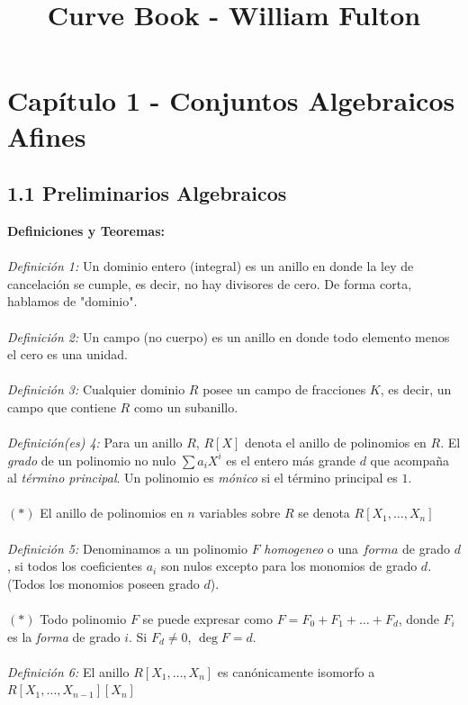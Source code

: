 \documentclass{article}
\begin{document}
\title{\textbf{Curve Book - William Fulton}}
\date{}
\maketitle
\section*{Capítulo 1 - Conjuntos Algebraicos Afines}
\subsection*{1.1 Preliminarios Algebraicos}
\textbf{Definiciones y Teoremas:}
\\
\\
\textit{Definición 1:} Un dominio entero (integral) es un anillo en donde la ley de cancelación se cumple, es decir, no hay divisores de cero. De forma corta, hablamos de "dominio".
\\
\\
\textit{Definición 2:} Un campo (no cuerpo) es un anillo en donde todo elemento menos el cero es una unidad.
\\
\\
\textit{Definición 3:} Cualquier dominio $R$ posee un campo de fracciones $K$, es decir, un campo que contiene $R$ como un subanillo.
\\
\\
\textit{Definición(es) 4:} Para un anillo $R$, $R[X]$ denota el anillo de polinomios en $R$. El \textit{grado} de un polinomio no nulo $\sum a_i X^{i}$ es el entero más grande $d$ que acompaña al \textit{término principal}. Un polinomio es \textit{mónico} si el término principal es $1$.
\\
\\
$(*)$ El anillo de polinomios en $n$ variables sobre $R$ se denota $R[X_1, \dots , X_n]$
\\
\\
\textit{Definición 5:} Denominamos a un polinomio $F$ \textit{homogeneo} o una $\textit{forma}$ de grado $d$, si todos los coeficientes $a_i$ son nulos excepto para los monomios de grado $d$. (Todos los monomios poseen grado $d$).
\\
\\
$(*)$ Todo polinomio $F$ se puede expresar como $F=F_{0}+F_1 + \dots +F_d$, donde $F_i$ es la \textit{forma} de grado $i$. Si $F_d \neq 0$, $\deg{F}=d$.
\\
\\
\textit{Definición 6:} El anillo $R[X_1 , \dots, X_n]$ es canónicamente isomorfo a $R[X_1 , \dots , X_{n-1}][X_n]$
\end{document}
